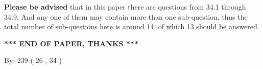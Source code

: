 \documentclass[12pt]{article}
\begin{document}
{\textbf{\large{Please be advised}}} that in this paper there are questions from
34.1 through
34.9.
And any one of them may contain more than one sub-question, thus the total number
of sub-questions here is around 14, of which
13 should be answered.
 
   
   
   
   
\vspace{1.0in} 
{\textbf{\large{ *** END OF PAPER, THANKS *** }}} 
   
   
\hspace{1.0in} By: 
         239 (          26 ,           34 )
   
   
 
 
\end{document}
